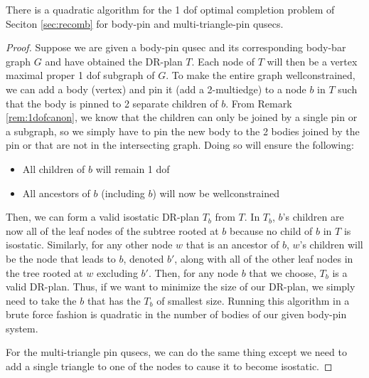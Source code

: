 \begin{theorem}
    There is a quadratic algorithm for the 1 dof optimal completion problem of Seciton \ref{sec:recomb} for body-pin and multi-triangle-pin qusecs.
\end{theorem}

\begin{proof}
    Suppose we are given a body-pin qusec and its corresponding body-bar graph $G$ and have obtained the DR-plan $T$. Each node of $T$ will then be a vertex maximal proper 1 dof subgraph of $G$. To make the entire graph wellconstrained, we can add a body (vertex) and pin it (add a 2-multiedge) to a node $b$ in $T$ such that the body is pinned to 2 separate children of $b$. From Remark \ref{rem:1dofcanon}, we know that the children can only be joined by a single pin or a subgraph, so we simply have to pin the new body to the 2 bodies joined by the pin or that are not in the intersecting graph. Doing so will ensure the following:

    \begin{itemize}
        \item All children of $b$ will remain 1 dof
        \item All ancestors of $b$ (including $b$) will now be wellconstrained
    \end{itemize}

    Then, we can form a valid isostatic DR-plan $T_b$ from $T$. In $T_b$, $b$'s children are now all of the leaf nodes of the subtree rooted at $b$ because no child of $b$ in $T$ is isostatic. Similarly, for any other node $w$ that is an ancestor of $b$, $w$'s children will be the node that leads to $b$, denoted $b'$, along with all of the other leaf nodes in the tree rooted at $w$ excluding $b'$. Then, for any node $b$ that we choose, $T_b$ is a valid DR-plan. Thus, if we want to minimize the size of our DR-plan, we simply need to take the $b$ that has the $T_b$ of smallest size. Running this algorithm in a brute force fashion is quadratic in the number of bodies of our given body-pin system.

    For the multi-triangle pin qusecs, we can do the same thing except we need to add a single triangle to one of the nodes to cause it to become isostatic.

\end{proof}

